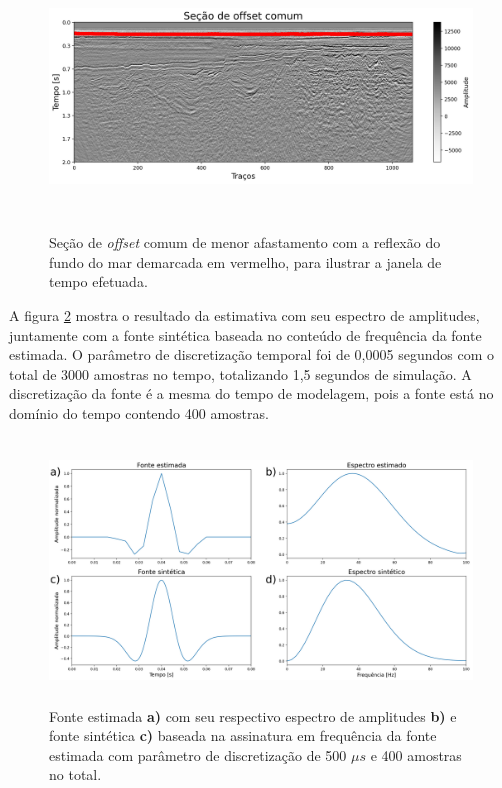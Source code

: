 \documentclass[
	12pt,				%
	openright,			%
	oneside,			%
	a4paper,			%
	english,			%
	brazil				%
	]{abntex2}
\begin{document}
	\begin{figure}[htp!]
		\centering
		\includegraphics[width=16cm,height=7cm]{../imagens/estimativaWavelet.png}
		\caption{Seção de \textit{offset} comum de menor afastamento com a reflexão do fundo do mar demarcada em vermelho, para ilustrar a janela de tempo efetuada.}
		\label{westim}
	\end{figure}
	
	A figura \ref{inputSource} mostra o resultado da estimativa com seu espectro de amplitudes, juntamente com a fonte sintética baseada no conteúdo de frequência da fonte estimada. O parâmetro de discretização temporal foi de 0,0005 segundos com o total de 3000 amostras no tempo, totalizando 1,5 segundos de simulação. A discretização da fonte é a mesma do tempo de modelagem, pois a fonte está no domínio do tempo contendo 400 amostras.
	\begin{figure}[htp!]
		\centering
		\includegraphics[width=14cm,height=7cm]{../imagens/waveletsModeling.png}
		\caption{Fonte estimada \textbf{a)} com seu respectivo espectro de amplitudes \textbf{b)} e fonte sintética \textbf{c)} baseada na assinatura em frequência da fonte estimada com parâmetro de discretização de 500 $\mu s$ e 400 amostras no total.}
		\label{inputSource}
	\end{figure}
	
\end{document}
